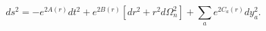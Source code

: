 \begin{equation}
ds^2=-e^{2A(r)}dt^2+e^{2B(r)}[dr^2+r^2d\Omega_n^2]+\sum_a e^{2C_a(r)}
dy_a^2.
\label{eq:genmet}
\end{equation}

